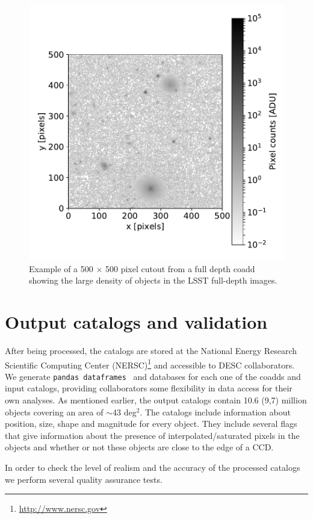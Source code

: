 \documentclass[twocolumn]{aastex62}
\begin{document}
\begin{figure}
\centering
\includegraphics[width=0.9\columnwidth]{sample_coadd_DC1.pdf}
\caption{Example of a 500 $\times$ 500 pixel cutout from a full depth coadd showing the large density of objects in the LSST full-depth images.}
\label{fig:coadd_example}
\end{figure}

\section{Output catalogs and validation}
\label{sec:catalogs}
After being processed, the catalogs are stored at the National Energy Research Scientific Computing Center (NERSC)\footnote{\url{http://www.nersc.gov}} and accessible to DESC collaborators. We generate \texttt{pandas
dataframes}~\citep{mckinney-proc-scipy-2010} and databases for each one of the coadds and input catalogs, providing collaborators some flexibility in data access for their own analyses. As mentioned earlier, the output catalogs contain 10.6 (9,7) million objects covering an area
of $\sim$43 deg$^{2}$. The catalogs include information about position, size, shape and magnitude for every object. They include several flags that give information about the presence of interpolated/saturated pixels in the objects and whether or not these objects are close to the edge of a CCD.

In order to check the level of realism and the accuracy of the processed catalogs we perform several quality assurance tests.
\end{document}
